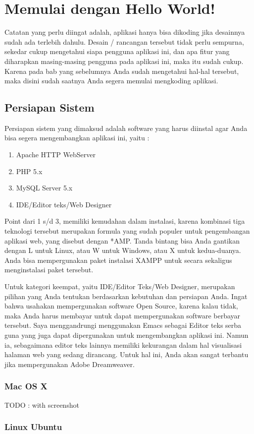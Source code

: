 \chapter{Memulai dengan Hello World!}
Catatan yang perlu diingat adalah, aplikasi hanya bisa dikoding jika desainnya sudah ada terlebih dahulu. Desain / rancangan tersebut tidak perlu sempurna, sekedar cukup mengetahui siapa pengguna aplikasi ini, dan apa fitur yang diharapkan masing-masing pengguna pada aplikasi ini, maka itu sudah cukup. Karena pada bab yang sebelumnya Anda sudah mengetahui hal-hal tersebut, maka disini sudah saatnya Anda segera memulai mengkoding aplikasi.
\section{Persiapan Sistem}
Persiapan sistem yang dimaksud adalah software yang harus diinstal agar Anda bisa segera mengembangkan aplikasi ini, yaitu :
\begin{enumerate}
\item Apache HTTP WebServer
\item PHP 5.x
\item MySQL Server 5.x
\item IDE/Editor teks/Web Designer
\end{enumerate}
Point dari 1 s/d 3, memiliki kemudahan dalam instalasi, karena kombinasi tiga teknologi tersebut merupakan formula yang sudah populer untuk pengembangan aplikasi web, yang disebut dengan *AMP. Tanda bintang bisa Anda gantikan dengan L untuk Linux, atau W untuk Windows, atau X untuk kedua-duanya. Anda bisa mempergunakan paket instalasi XAMPP untuk secara sekaligus menginstalasi paket tersebut. 

Untuk kategori keempat, yaitu IDE/Editor Teks/Web Designer, merupakan pilihan yang Anda tentukan berdasarkan kebutuhan dan persiapan Anda. Ingat bahwa usahakan mempergunakan software Open Source, karena kalau tidak, maka Anda harus membayar untuk dapat mempergunakan software berbayar tersebut. Saya menggandrungi menggunakan Emacs sebagai Editor teks serba guna yang juga dapat dipergunakan untuk mengembangkan aplikasi ini. Namun ia, sebagaimana editor teks lainnya memiliki kekurangan dalam hal visualisasi halaman web yang sedang dirancang. Untuk hal ini, Anda akan sangat terbantu jika mempergunakan Adobe Dreamweaver.
\subsection{Mac OS X}
TODO : with screenshot
\subsection{Linux Ubuntu}
